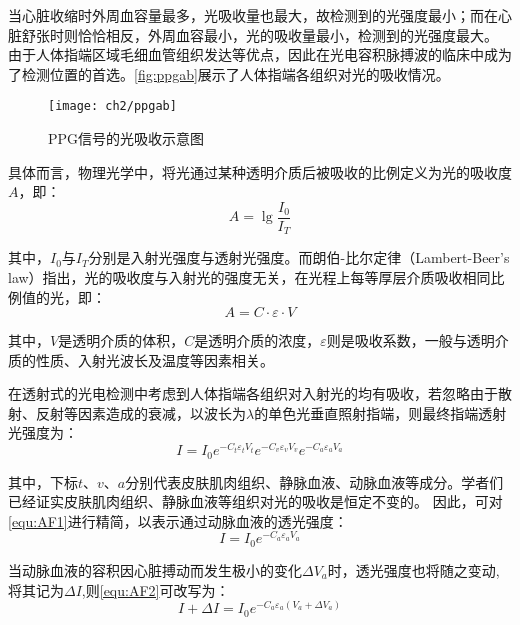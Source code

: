 当心脏收缩时外周血容量最多，光吸收量也最大，故检测到的光强度最小；而在心脏舒张时则恰恰相反，外周血容最小，光的吸收量最小，检测到的光强度最大\cite{lhc,cwl}。
由于人体指端区域毛细血管组织发达等优点，因此在光电容积脉搏波的临床中成为了检测位置的首选。\autoref{fig:ppgab}展示了人体指端各组织对光的吸收情况。
\begin{figure}[htb]
    \centering
    \texttt{[image: ch2/ppgab]}
    \caption{\label{fig:ppgab}PPG信号的光吸收示意图}
\end{figure}

具体而言，物理光学中，将光通过某种透明介质后被吸收的比例定义为光的吸收度$A$，即：
\begin{equation}
    \label{equ:LBL}
    A=\lg\frac{I_{0}}{I_{T}}
\end{equation}

其中，$I_{0}$与$I_{T}$分别是入射光强度与透射光强度。而朗伯-比尔定律（Lambert-Beer's law）指出，光的吸收度与入射光的强度无关，在光程上每等厚层介质吸收相同比例值的光，即：
\begin{equation}
    \label{equ:LBL2}
    A=C \cdot \varepsilon \cdot V
\end{equation}

其中，$V$是透明介质的体积，$C$是透明介质的浓度，$\varepsilon$则是吸收系数，一般与透明介质的性质、入射光波长及温度等因素相关。

在透射式的光电检测中考虑到人体指端各组织对入射光的均有吸收，若忽略由于散射、反射等因素造成的衰减，以波长为$\lambda$的单色光垂直照射指端，则最终指端透射光强度为\cite{4122392}：
\begin{equation}
    \label{equ:AF1}
    I=I_{0}e^{-C_{t}\varepsilon _{t}V_{t}}e^{-C_{v}\varepsilon _{v}V_{v}} e^{-C_{a}\varepsilon _{a}V_{a}} 
\end{equation}

其中，下标$t$、$v$、$a$分别代表皮肤肌肉组织、静脉血液、动脉血液等成分。学者们已经证实皮肤肌肉组织、静脉血液等组织对光的吸收是恒定不变的\cite{1980Spectrophotometric,4122392}。
因此，可对\autoref{equ:AF1}进行精简，以表示通过动脉血液的透光强度\cite{PPGYY}：
\begin{equation}
    \label{equ:AF2}
    I=I_{0}e^{-C_{a}\varepsilon _{a}V_{a}} 
\end{equation}

当动脉血液的容积因心脏搏动而发生极小的变化$\Delta V_{a}$时，透光强度也将随之变动,将其记为$\Delta I$,则\autoref{equ:AF2}可改写为：
\begin{equation}
    \label{equ:AF3}
    I+\Delta I=I_{0}e^{-C_{a}\varepsilon _{a}(V_{a}+\Delta V_{a})} 
\end{equation}

